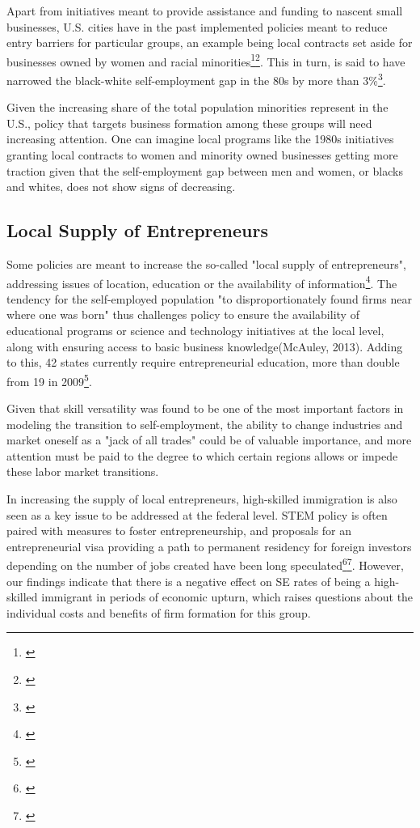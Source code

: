 Apart from initiatives meant to provide assistance and funding to nascent small businesses, U.S. cities have in the past implemented policies meant to reduce entry barriers for particular groups, an example being local contracts set aside for businesses owned by women and racial minorities\footnote{\cite{ChatterjiGlaeserKerr2014}}\hspace{.15em}\footnote{\cite{Lerner2009}}. This in turn, is said to have narrowed the black-white self-employment gap in the 80s by more than 3\%\footnote{\cite{ChatterjiGlaeserKerr2014}}.

Given the increasing share of the total population minorities represent in the U.S., policy that targets business formation among these groups will need increasing attention. One can imagine local programs like the 1980s initiatives granting local contracts to women and minority owned businesses getting more traction given that the self-employment gap between men and women, or blacks and whites, does not show signs of decreasing.  

\subsection{Local Supply of Entrepreneurs}

Some policies are meant to increase the so-called "local supply of entrepreneurs", addressing issues of location, education or the availability of information\footnote{\cite{Lerner2009}}. The tendency for the self-employed population "to disproportionately found firms near where one was born" thus challenges policy to ensure the availability of educational programs or science and technology initiatives at the local level, along with ensuring access to basic business knowledge(McAuley, 2013). Adding to this, 42 states currently require entrepreneurial education, more than double from 19 in 2009\footnote{\cite{ChatterjiGlaeserKerr2014}}. 

Given that skill versatility was found to be one of the most important factors in modeling the transition to self-employment, the ability to change industries and market oneself as a "jack of all trades" could be of valuable importance, and more attention must be paid to the degree to which certain regions allows or impede these labor market transitions.

In increasing the supply of local entrepreneurs, high-skilled immigration is also seen as a key issue to be addressed at the federal level. STEM policy is often paired with measures to foster entrepreneurship, and proposals for an entrepreneurial visa providing a path to permanent residency for foreign investors depending on the number of jobs created have been long speculated\footnote{\cite{Dalziel2008}}\hspace{.15em}\footnote{\cite{ChatterjiGlaeserKerr2014}}. However, our findings indicate that there is a negative effect on SE rates of being a high-skilled immigrant in periods of economic upturn, which raises questions about the individual costs and benefits of firm formation for this group.

